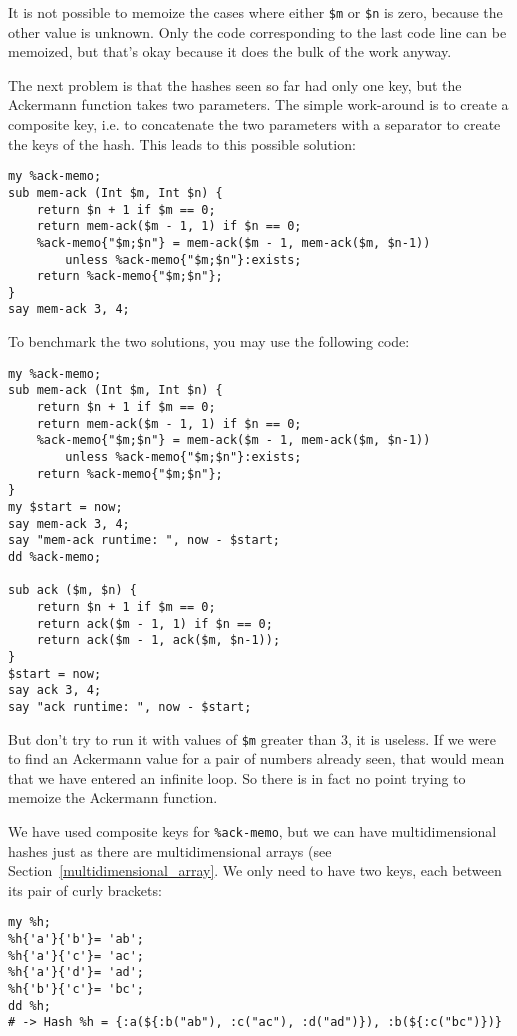 It is not possible to memoize the cases where either \verb'$m' 
or \verb'$n' is zero, because the other value is unknown. Only 
the code corresponding to the last code line can be memoized, 
but that's okay because it does the bulk of the work anyway.

The next problem is that the hashes seen so far had only one 
key, but the Ackermann function takes two parameters. The 
simple work-around is to create a composite key, i.e. to 
concatenate the two parameters with a separator to create 
the keys of the hash. This leads to this possible solution:

\begin{verbatim}
my %ack-memo;
sub mem-ack (Int $m, Int $n) {
    return $n + 1 if $m == 0;
    return mem-ack($m - 1, 1) if $n == 0;
    %ack-memo{"$m;$n"} = mem-ack($m - 1, mem-ack($m, $n-1))
        unless %ack-memo{"$m;$n"}:exists;
    return %ack-memo{"$m;$n"};
}
say mem-ack 3, 4;
\end{verbatim} 

To benchmark the two solutions, you may use the following 
code:

\begin{verbatim}
my %ack-memo;
sub mem-ack (Int $m, Int $n) {
    return $n + 1 if $m == 0;
    return mem-ack($m - 1, 1) if $n == 0;
    %ack-memo{"$m;$n"} = mem-ack($m - 1, mem-ack($m, $n-1)) 
        unless %ack-memo{"$m;$n"}:exists;
    return %ack-memo{"$m;$n"};
}
my $start = now;
say mem-ack 3, 4;
say "mem-ack runtime: ", now - $start;
dd %ack-memo;

sub ack ($m, $n) {
    return $n + 1 if $m == 0;
    return ack($m - 1, 1) if $n == 0;
    return ack($m - 1, ack($m, $n-1));
}
$start = now;
say ack 3, 4;
say "ack runtime: ", now - $start;
\end{verbatim}

But don't try to run it with values of \verb'$m' greater 
than 3, it is useless. If we were to find an Ackermann 
value for a pair of numbers already seen, that would 
mean that we have entered an infinite loop. So there is 
in fact no point trying to memoize the Ackermann function.

We have used composite keys for \verb'%ack-memo', but we 
can have multidimensional hashes just as there are 
multidimensional arrays (see Section~\ref{multidimensional_array}. 
We only need to have two keys, each between its pair of 
curly brackets:
\begin{verbatim}
my %h;
%h{'a'}{'b'}= 'ab';
%h{'a'}{'c'}= 'ac';
%h{'a'}{'d'}= 'ad';
%h{'b'}{'c'}= 'bc';
dd %h; 
# -> Hash %h = {:a(${:b("ab"), :c("ac"), :d("ad")}), :b(${:c("bc")})}
\end{verbatim}
%

